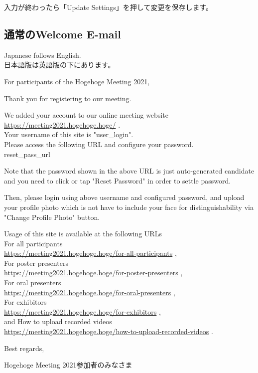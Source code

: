 \documentclass[titlepage,10pt,a4paper,uplatex]{jsbook}
\newenvironment{content}{\begin{shaded}\vspace{-1em}\raggedright\ttfamily\footnotesize\setlength{\baselineskip}{1.4em}}{\end{shaded}\vspace{-1em}}
\begin{document}
入力が終わったら「Update Settings」を押して変更を保存します。

\subsection{通常のWelcome E-mail}

\begin{content}
Japanese follows English.\\
日本語版は英語版の下にあります。

For participants of the Hogehoge Meeting 2021,

Thank you for registering to our meeting.

We added your account to our online meeting website \url{https://meeting2021.hogehoge.hoge/} .\\
Your username of this site is "{\lbrack}user\_login{\rbrack}".\\
Please access the following URL and configure your password.\\
{\lbrack}reset\_pass\_url{\rbrack}

Note that the password shown in the above URL is just auto-generated candidate and you need to click or tap "Reset Password" in order to settle password.

Then, please login using above username and configured password, and upload your profile photo which is not have to include your face for distinguishability via "Change Profile Photo" button.

Usage of this site is available at the following URLs\\
For all participants\\
\url{https://meeting2021.hogehoge.hoge/for-all-participants} ,\\
For poster presenters\\
\url{https://meeting2021.hogehoge.hoge/for-poster-presenters} ,\\
For oral presenters\\
\url{https://meeting2021.hogehoge.hoge/for-oral-presenters} ,\\
For exhibitors\\
\url{https://meeting2021.hogehoge.hoge/for-exhibitors} ,\\
and How to upload recorded videos\\
\url{https://meeting2021.hogehoge.hoge/how-to-upload-recorded-videos} .

Best regards,

Hogehoge Meeting 2021参加者のみなさま


\end{content}
\end{document}
